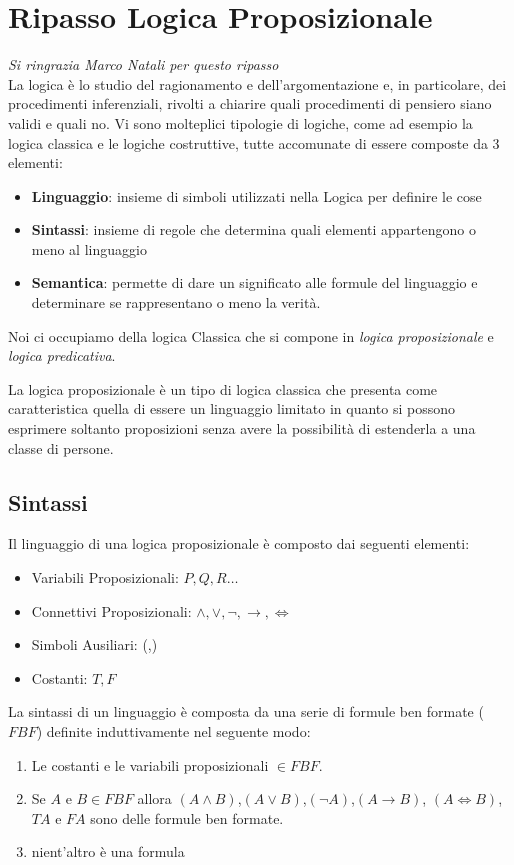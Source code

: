 \documentclass[a4paper,12pt, oneside]{book}
\begin{document}
\section{Ripasso Logica Proposizionale}
\emph{Si ringrazia Marco Natali per questo ripasso}\\
La logica è lo studio del ragionamento e dell’argomentazione e, in particolare,
dei procedimenti inferenziali, rivolti a chiarire quali	procedimenti di pensiero
siano validi e quali no. Vi sono molteplici tipologie di logiche, come ad
esempio la logica classica e le logiche costruttive, tutte accomunate di essere
composte da 3 elementi: 
\begin{itemize}
  \item \textbf{Linguaggio}: insieme di simboli utilizzati nella Logica per
  definire le cose 
  \item \textbf{Sintassi}: insieme di regole che determina quali elementi
  appartengono o meno al linguaggio 
  \item \textbf{Semantica}: permette di dare un significato alle formule del
  linguaggio e determinare se rappresentano o meno la verità.
\end{itemize}

Noi ci occupiamo della logica Classica che si compone in \textit{logica
  proposizionale} e \textit{logica predicativa}.

La logica proposizionale è un tipo di logica classica che presenta come
caratteristica quella di essere un linguaggio limitato in quanto si possono
esprimere soltanto proposizioni senza avere la possibilità di estenderla a una
classe di persone.
\newpage
\subsection{Sintassi}
Il linguaggio di una logica proposizionale è composto dai seguenti elementi:

\begin{itemize}
  \item Variabili Proposizionali: $P,Q,R \dots$
  \item Connettivi Proposizionali: $\land, \lor, \neg, \rightarrow, \iff$
  \item Simboli Ausiliari: (,)
  \item Costanti: $T,F$
\end{itemize}

La sintassi di un linguaggio è composta da una serie di formule ben
formate ($FBF$) definite induttivamente nel seguente modo:
\begin{enumerate}
  \item Le costanti e le variabili proposizionali $\in FBF$.

  \item Se $A$ e $B \in FBF$ allora $(A \land B)$,$(A \lor B)$,$(\neg A)$,$(A
  \rightarrow B)$, $(A \iff B)$, $TA$ e $FA$ sono delle formule ben formate.
  \item nient'altro è una formula
\end{enumerate}
\end{document}
